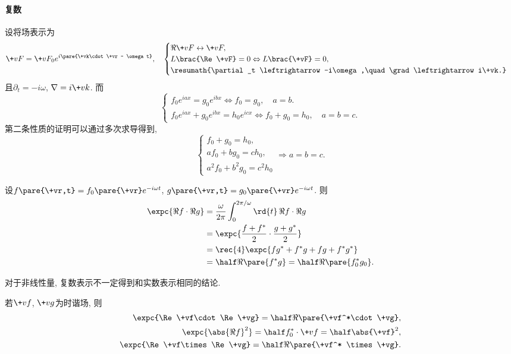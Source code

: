 \documentclass[hidelinks]{ctexart}
\begin{document}
\paragraph{复数} %
\label{par:复数}

设将场表示为
\[ \+vF = \+vF_0 e^{i\pare{\+vk\cdot \+vr - \omega t}},\quad \begin{cases}
    \Re \+vF \leftrightarrow \+vF, \\
    L\brac{\Re \+vF} = 0 \Leftrightarrow L\brac{\+vF} = 0, \\
    \resumath{\partial_t \leftrightarrow -i\omega,\quad \grad \leftrightarrow i\+vk.}
\end{cases} \]
且$\partial_t = -i\omega$, $\nabla = i\+vk$. 而
\[ \begin{cases}
    f_0 e^{iax} = g_0 e^{ibx} \Leftrightarrow f_0 = g_0, \quad a=b. \\
    f_0 e^{iax} + g_0 e^{ibx} = h_0 e^{icx} \Leftrightarrow f_0 + g_0 = h_0,\quad a=b=c.
\end{cases} \]
第二条性质的证明可以通过多次求导得到,
\[ \begin{cases}
    f_0 + g_0 = h_0, \\
    af_0 + bg_0 = ch_0, \\
    a^2 f_0 + b^2 g_0 = c^2 h_0
\end{cases} \Rightarrow a=b=c. \]
\begin{sample}
    \begin{ex}
        设$f\pare{\+vr,t} = f_0\pare{\+vr} e^{-i\omega t}$, $g\pare{\+vr,t} = g_0\pare{\+vr} e^{-i\omega t}$. 则
        \begin{align*}
            \expc{\Re f\cdot \Re g} &= \frac{\omega}{2\pi}\int_0^{2\pi / \omega} \rd{t}\, \Re f\cdot \Re g \\
            &= \expc{\frac{f+f^*}{2} \cdot \frac{g+g^*}{2}} \\
            &= \rec{4}\expc{fg^* + f^*g + fg + f^*g^*} \\
            &= \half \Re\pare{f^* g} = \half \Re\pare{f_0^* g_0}.
        \end{align*}
    \end{ex}
\end{sample}
\begin{pitfall}
    对于非线性量, 复数表示不一定得到和实数表示相同的结论.
\end{pitfall}
\begin{resume}
    若$\+vf$, $\+vg$为时谐场, 则
    \begin{align*}
        \expc{\Re \+vf\cdot \Re \+vg} = \half \Re\pare{\+vf^*\cdot \+vg}, \\
        \expc{\abs{\Re f}^2} = \half f_0^* \cdot \+vf = \half \abs{\+vf}^2, \\
        \expc{\Re \+vf\times \Re \+vg} = \half \Re\pare{\+vf^* \times \+vg}.
    \end{align*}
\end{resume}
\end{document}

